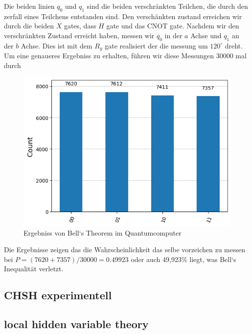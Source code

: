 Die beiden linien $q_0$ und $q_1$ sind die beiden verschränkten Teilchen, die durch den zerfall eines Teilchens entstanden sind.
Den verschänkten zustand erreichen wir durch die beiden $X$ gates, dass $H$ gate und das CNOT gate.
Nachdem wir den verschränkten Zustand erreicht haben, messen wir $q_0$ in der $a$ Achse und $q_1$ an der $b$ Achse. Dies ist mit dem $R_y$ gate realisiert der die messung um $120^\circ$ dreht.\\

Um eine genaueres Ergebniss zu erhalten, führen wir diese Messungen 30000 mal durch
\begin{figure}[H]
    \centering
    \includegraphics[width=0.8\linewidth]{img/BellResult.png}
    \caption{Ergebniss von Bell`s Theorem im Quantumcomputer}
    \label{fig:BellResult}
\end{figure}

Die Ergebnisse zeigen das die Wahrscheinlichkeit das selbe vorzeichen zu messen bei $P = (7620 + 7357) / 30000 = 0.49923$ oder auch 49,923\% liegt, was Bell`s Inequalität verletzt.\\


\subsection{CHSH experimentell}
\label{subsec:chsh_experimentell}


\subsection{local hidden variable theory}
\label{subsec:chsh_lhvt}